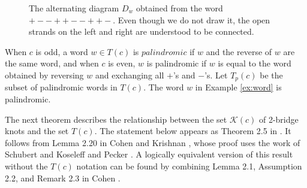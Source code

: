 \documentclass[12pt]{amsart}
\theoremstyle{definition}
\theoremstyle{remark}
\numberwithin{equation}{section}
\def\red{\color{red}}
\begin{document}
\begin{figure}[h!]
\caption{The alternating diagram $D_w$ obtained from the word $+--++--++-$. Even though we do not draw it, the open strands on the left and right are understood to be connected.}
\label{fig:ex1}
\end{figure}



When $c$ is odd, a word $w\in T(c)$ is $\textit{palindromic}$ if $w$ and the reverse of $w$ are the same word, and when $c$ is even, $w$ is palindromic if $w$ is equal to the word obtained by reversing $w$ and exchanging all $+$'s and $-$'s. Let $T_p(c)$ be the subset of palindromic words in $T(c)$. The word $w$ in Example \ref{ex:word} is palindromic.


The next theorem describes the relationship between the set $\mathcal{K}(c)$ of 2-bridge knots and the set $T(c)$.  The statement below  appears as Theorem 2.5 in \cite{CohLow}. It follows from Lemma 2.20 in Cohen and Krishnan \cite{CoKr}, whose proof uses the work of Schubert \cite{Sch} and Koseleff and Pecker \cite{KosPec4}. A logically equivalent version of this result without the $T(c)$ notation can be found by combining Lemma 2.1, Assumption 2.2, and Remark 2.3 in Cohen \cite{Coh:lower}. %
\end{document}
